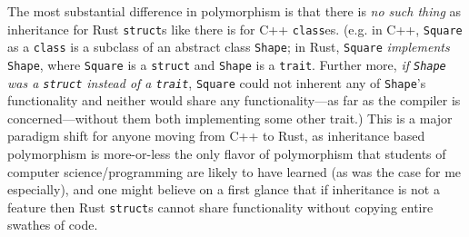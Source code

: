 \documentclass{report}
\begin{document}
The most substantial difference in polymorphism is that there is \emph{no such
thing} as inheritance for Rust \Verb+struct+s like there is for C++
\Verb+class+es. (e.g. in C++, \Verb+Square+ as a \Verb+class+ is a subclass of
an abstract class \Verb+Shape+;
in Rust, \Verb+Square+ \emph{implements} \Verb+Shape+, where \Verb+Square+ is a
\Verb+struct+ and \Verb+Shape+ is a \Verb+trait+. Further more, \emph{if
\Verb+Shape+ was a \Verb+struct+ instead of a \Verb+trait+},
\Verb+Square+ could not inherent any of \Verb+Shape+'s functionality and neither
would share any functionality---as far as the compiler is concerned---without
them both implementing some other trait.)
This is a major paradigm shift for anyone moving from C++ to Rust, as
inheritance based polymorphism is more-or-less the only flavor of polymorphism
that students of computer science/programming are likely to have learned (as was
the case for me especially), and one might believe on a first glance that if
inheritance is not a feature then Rust \Verb+struct+s cannot share functionality
without copying entire swathes of code.
\end{document}
